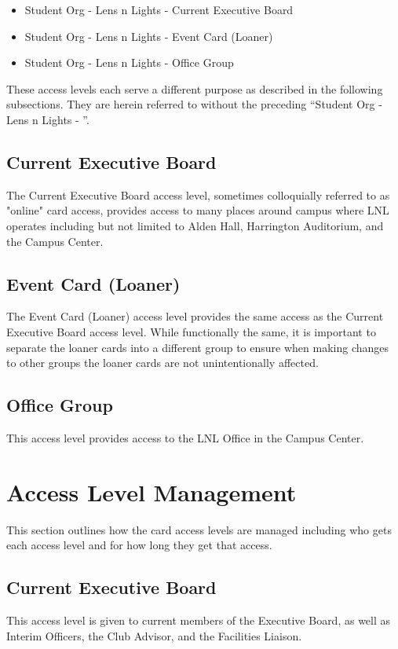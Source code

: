 \documentclass[12pt,letterpaper,oneside]{book}
\begin{document}
\begin{itemize}
    \item Student Org - Lens n Lights - Current Executive Board
    \item Student Org - Lens n Lights - Event Card (Loaner)
    \item Student Org - Lens n Lights - Office Group
\end{itemize}

These access levels each serve a different purpose as described in the following subsections. They are herein referred to without the preceding ``Student Org - Lens n Lights - ''.

\subsection{Current Executive Board}
The Current Executive Board access level, sometimes colloquially referred to as "online" card access, provides access to many places around campus where LNL operates including but not limited to Alden Hall, Harrington Auditorium, and the Campus Center.

\subsection{Event Card (Loaner)}
The Event Card (Loaner) access level provides the same access as the Current Executive Board access level. While functionally the same, it is important to separate the loaner cards into a different group to ensure when making changes to other groups the loaner cards are not unintentionally affected.

\subsection{Office Group}
This access level provides access to the LNL Office in the Campus Center.

\section{Access Level Management}
This section outlines how the card access levels are managed including who gets each access level and for how long they get that access.

\subsection{Current Executive Board}
This access level is given to current members of the Executive Board, as well as Interim Officers, the Club Advisor, and the Facilities Liaison.
\end{document}
